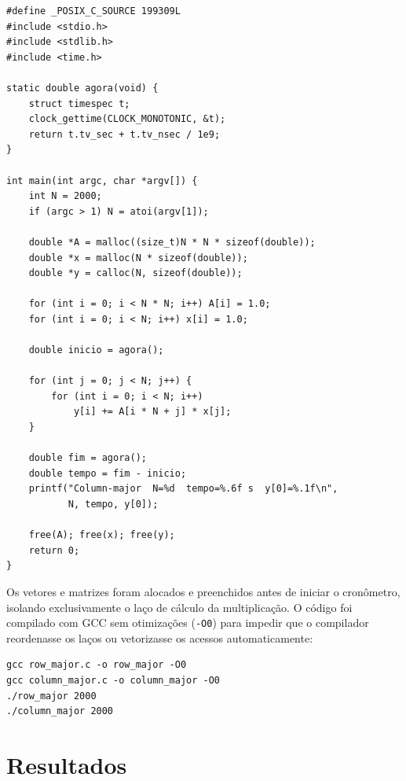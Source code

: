 \documentclass[11pt,letterpaper]{article}
\begin{document}
\newpage
\begin{lstlisting}[caption={Acesso por colunas (column-major)}, label={lst:col}]
#define _POSIX_C_SOURCE 199309L
#include <stdio.h>
#include <stdlib.h>
#include <time.h>

static double agora(void) {
    struct timespec t;
    clock_gettime(CLOCK_MONOTONIC, &t);
    return t.tv_sec + t.tv_nsec / 1e9;
}

int main(int argc, char *argv[]) {
    int N = 2000;
    if (argc > 1) N = atoi(argv[1]);

    double *A = malloc((size_t)N * N * sizeof(double));
    double *x = malloc(N * sizeof(double));
    double *y = calloc(N, sizeof(double));

    for (int i = 0; i < N * N; i++) A[i] = 1.0;
    for (int i = 0; i < N; i++) x[i] = 1.0;

    double inicio = agora();

    for (int j = 0; j < N; j++) {
        for (int i = 0; i < N; i++)
            y[i] += A[i * N + j] * x[j];
    }

    double fim = agora();
    double tempo = fim - inicio;
    printf("Column-major  N=%d  tempo=%.6f s  y[0]=%.1f\n",
           N, tempo, y[0]);

    free(A); free(x); free(y);
    return 0;
}
\end{lstlisting}

\newpage
Os vetores e matrizes foram alocados e preenchidos antes de iniciar o cronômetro, isolando exclusivamente o laço de cálculo da multiplicação. O código foi compilado com GCC sem otimizações (\texttt{-O0}) para impedir que o compilador reordenasse os laços ou vetorizasse os acessos automaticamente:

\begin{lstlisting}[caption={Compilação e execução dos testes}, label={lst:exec}]
gcc row_major.c -o row_major -O0
gcc column_major.c -o column_major -O0
./row_major 2000
./column_major 2000
\end{lstlisting}

\section{Resultados}
\end{document}
